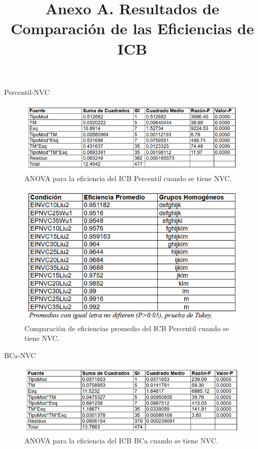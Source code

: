 \title{Anexo A. Resultados de Comparación de las Eficiencias de ICB}


Percentil-NVC

\begin{figure}[ht] 
	\centering 
	\includegraphics[width=0.95\linewidth]{img/ANOVA_Efic_ICB_Perc_NVC.png} 
	\caption{ANOVA para la eficiencia del ICB Percentil cuando se tiene NVC.} 
	\label{fig:ANOVA_Efic_ICB_Perc_NVC}
\end{figure}
\FloatBarrier


\begin{figure}[ht] 
	\centering 
	\includegraphics[width=0.76\linewidth]{img/CompEfic_PromICB_Perc_NVC.png} 
	\caption{Comparación de eficiencias promedio del ICB Percentil cuando se tiene NVC.} 
	\label{fig:CompEfic_PromICB_Perc_NVC}
\end{figure}
\FloatBarrier



BCa-NVC

\begin{figure}[ht] 
	\centering 
	\includegraphics[width=0.95\linewidth]{img/ANOVA_Efic_ICB_BCa_NVC.png} 
	\caption{ANOVA para la eficiencia del ICB BCa cuando se tiene NVC.} 
	\label{fig:ANOVA_Efic_ICB_BCa_NVC}
\end{figure}
\FloatBarrier


